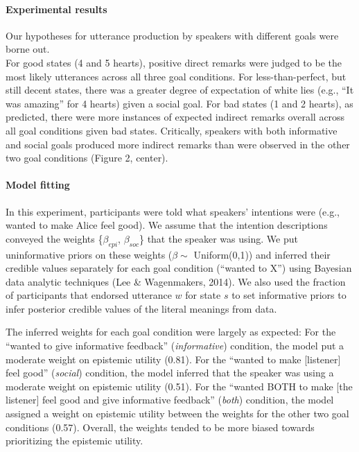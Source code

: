 \paragraph{Experimental results}

Our hypotheses for utterance production by speakers with different goals
were borne out.\\
For good states (4 and 5 hearts), positive direct remarks were judged to
be the most likely utterances across all three goal conditions. For
less-than-perfect, but still decent states, there was a greater degree
of expectation of white lies (e.g., ``It was amazing'' for 4 hearts)
given a social goal. For bad states (1 and 2 hearts), as predicted,
there were more instances of expected indirect remarks overall across
all goal conditions given bad states. Critically, speakers with both
informative and social goals produced more indirect remarks than were
observed in the other two goal conditions (Figure 2, center). %

\paragraph{Model fitting}

In this experiment, participants were told what speakers' intentions
were (e.g., wanted to make Alice feel good). We assume that the
intention descriptions conveyed the weights \{\(\beta_{epi}\),
\(\beta_{soc}\)\} that the speaker was using. We put uninformative
priors on these weights (\(\beta \sim\) Uniform(0,1)) and inferred their
credible values separately for each goal condition (``wanted to X'')
using Bayesian data analytic techniques (Lee \& Wagenmakers, 2014). We
also used the fraction of participants that endorsed utterance \(w\) for
state \(s\) to set informative priors to infer posterior credible values
of the literal meanings from data.

The inferred weights for each goal condition were largely as expected:
For the ``wanted to give informative feedback'' (\emph{informative})
condition, the model put a moderate weight on epistemic utility (0.81).
For the ``wanted to make {[}listener{]} feel good'' (\emph{social})
condition, the model inferred that the speaker was using a moderate
weight on epistemic utility (0.51). For the ``wanted BOTH to make {[}the
listener{]} feel good and give informative feedback'' (\emph{both})
condition, the model assigned a weight on epistemic utility between the
weights for the other two goal conditions (0.57). Overall, the weights
tended to be more biased towards prioritizing the epistemic utility.

